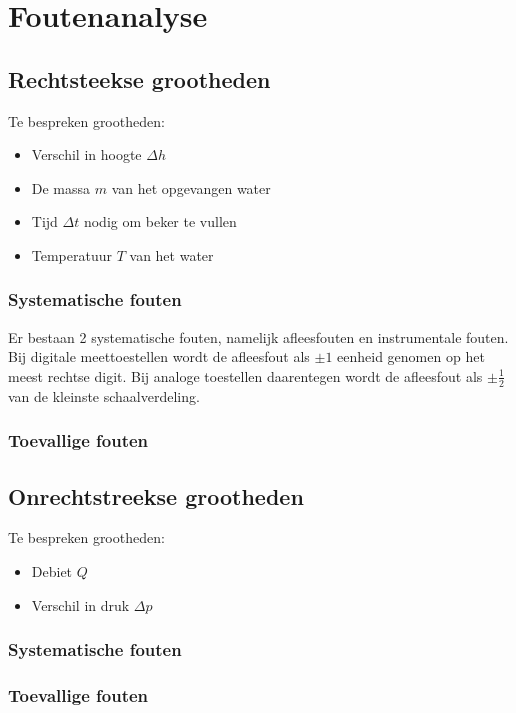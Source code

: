 \section{Foutenanalyse}

\subsection{Rechtsteekse grootheden}

Te bespreken grootheden:
\begin{itemize}
    \item Verschil in hoogte $\Delta h$
    \item De massa $m$ van het opgevangen water
    \item Tijd $\Delta t$ nodig om beker te vullen
    \item Temperatuur $T$ van het water
\end{itemize}

\subsubsection{Systematische fouten}
Er bestaan 2 systematische fouten, namelijk afleesfouten en instrumentale fouten. Bij digitale meettoestellen wordt de afleesfout als $\pm 1$ eenheid genomen op het meest rechtse digit. Bij analoge toestellen daarentegen wordt de afleesfout als $\pm \frac{1}{2}$ van de kleinste schaalverdeling.


\subsubsection{Toevallige fouten}

\subsection{Onrechtstreekse grootheden}

Te bespreken grootheden:
\begin{itemize}
    \item Debiet $Q$
    \item Verschil in druk $\Delta p$
\end{itemize}

\subsubsection{Systematische fouten}
\subsubsection{Toevallige fouten}

